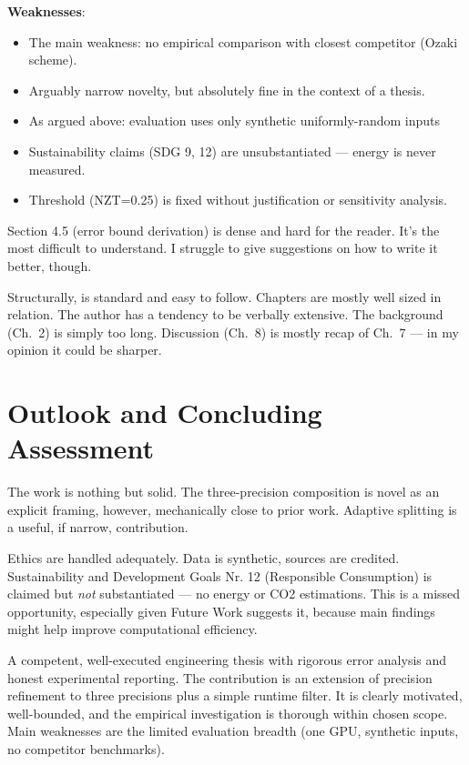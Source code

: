 \documentclass[11pt,a4paper]{article}
\begin{document}
\textbf{Weaknesses}:
\begin{itemize}
  \item The main weakness: no empirical comparison with closest competitor (Ozaki scheme).
  \item Arguably narrow novelty, but absolutely fine in the context of a thesis.
  \item As argued above: evaluation uses only synthetic uniformly-random inputs
  \item Sustainability claims (SDG 9, 12) are unsubstantiated --- energy is never measured.
  \item Threshold (NZT=0.25) is fixed without justification or sensitivity analysis.
\end{itemize}

Section 4.5 (error bound derivation) is dense and hard for the reader.
It's the most difficult to understand.
I struggle to give suggestions on how to write it better, though.

Structurally, is standard and easy to follow.
Chapters are mostly well sized in relation.
The author has a tendency to be verbally extensive.
The background (Ch.~2) is simply too long.
Discussion (Ch.~8) is mostly recap of Ch.~7 --- in my opinion it could be sharper.

\section{Outlook and Concluding Assessment}
The work is nothing but solid.
The three-precision composition is novel as an explicit framing, however, mechanically close to prior work.
Adaptive splitting is a useful, if narrow, contribution.

Ethics are handled adequately.
Data is synthetic, sources are credited.
Sustainability and Development Goals Nr. 12 (Responsible Consumption) is claimed but \emph{not} substantiated
--- no energy or CO2 estimations.
This is a missed opportunity, especially given Future Work suggests it, because main findings might help improve computational efficiency.

A competent, well-executed engineering thesis with rigorous error analysis and honest experimental reporting.
The contribution is an extension of precision refinement to three precisions plus a simple runtime filter.
It is clearly motivated, well-bounded, and the empirical investigation is thorough within chosen scope.
Main weaknesses are the limited evaluation breadth (one GPU, synthetic inputs, no competitor benchmarks).
\end{document}
